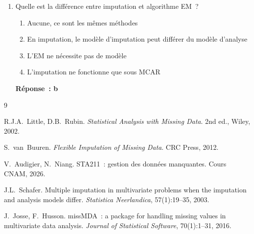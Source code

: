 \documentclass[a4paper,11pt]{article}
\theoremstyle{definition}
\theoremstyle{remark}
\begin{document}
\begin{enumerate}
  \item Quelle est la différence entre imputation et algorithme EM~?
    \begin{enumerate}
      \item Aucune, ce sont les mêmes méthodes
      \item En imputation, le modèle d'imputation peut différer du
        modèle d'analyse
      \item L'EM ne nécessite pas de modèle
      \item L'imputation ne fonctionne que sous MCAR
    \end{enumerate}
    \textbf{Réponse~: b}

\end{enumerate}

\begin{thebibliography}{9}

R.J.A.~Little, D.B.~Rubin.
\newblock \emph{Statistical Analysis with Missing Data}.
\newblock 2nd ed., Wiley, 2002.

S.~van~Buuren.
\newblock \emph{Flexible Imputation of Missing Data}.
\newblock CRC Press, 2012.

V.~Audigier, N.~Niang.
\newblock STA211~: gestion des données manquantes.
\newblock Cours CNAM, 2026.

J.L.~Schafer.
\newblock Multiple imputation in multivariate problems when the imputation
  and analysis models differ.
\newblock \emph{Statistica Neerlandica}, 57(1):19--35, 2003.

J.~Josse, F.~Husson.
\newblock missMDA~: a package for handling missing values in multivariate
  data analysis.
\newblock \emph{Journal of Statistical Software}, 70(1):1--31, 2016.

\end{thebibliography}
\end{document}
